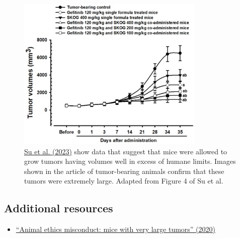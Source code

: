 \documentclass[letterpaper, 12pt]{article}
\begin{document}
\begin{figure}[h!tbp]
    \centering
    \includegraphics[width=0.8\textwidth]{img/tumor_burden/Screenshot 2025-04-04 at 15-50-26.png}
    \caption*{\href{https://doi.org/10.3390/app13021090}{Su et al. (2023)} show data that suggest that mice were allowed to grow tumors having volumes well in excess of humane limits. Images shown in the article of tumor-bearing animals confirm that these tumors were extremely large. Adapted from Figure 4 of Su et al.}
\end{figure}

\subsection*{Additional resources}

\begin{itemize}
    \setlength\itemsep{-0.5em}
    \item \href{https://scienceintegritydigest.com/2020/05/07/animal-ethics-misconduct-mice-with-very-large-tumors/}{``Animal ethics misconduct: mice with very large tumors'' (2020)}
\end{itemize}
\end{document}
